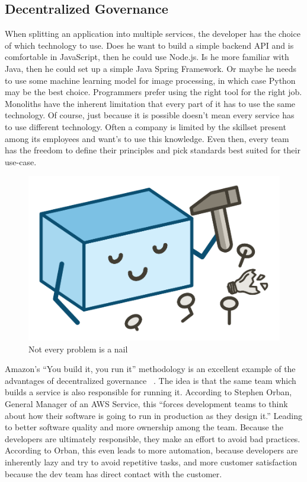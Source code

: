 \subsection{Decentralized Governance}

When splitting an application into multiple services, the developer has the choice of which technology to use. Does he want to build a simple backend API and is comfortable in JavaScript, then he could use Node.js. Is he more familiar with Java, then he could set up a simple Java Spring Framework. Or maybe he needs to use some machine learning model for image processing, in which case Python may be the best choice. Programmers prefer using the right tool for the right job. Monoliths have the inherent limitation that every part of it has to use the same technology. Of course, just because it is possible doesn't mean every service has to use different technology. Often a company is limited by the skillset present among its employees and want's to use this knowledge. Even then, every team has the freedom to define their principles and pick standards best suited for their use-case.

\begin{figure}[ht]
  \centering
  \includegraphics[width=0.4\linewidth]{assets/illustration-monolith-hammer.png}
  \caption{Not every problem is a nail}
\end{figure}

Amazon's ``You build it, you run it'' methodology is an excellent example of the advantages of decentralized governance ~\cite{amazon.2015}. The idea is that the same team which builds a service is also responsible for running it. According to Stephen Orban, General Manager of an AWS Service, this ``forces development teams to think about how their software is going to run in production as they design it.'' Leading to better software quality and more ownership among the team. Because the developers are ultimately responsible,  they make an effort to avoid bad practices. According to Orban, this even leads to more automation, because developers are inherently lazy and try to avoid repetitive tasks, and more customer satisfaction because the dev team has direct contact with the customer.


